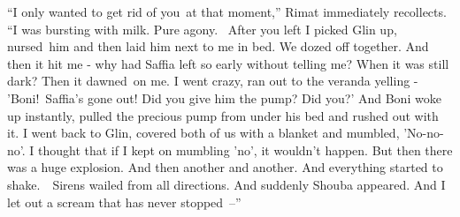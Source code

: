 \documentclass[twoside,11pt]{book}
\begin{document}
``I only wanted to get rid of you\ at that moment,'' Rimat immediately recollects.
``I was bursting with milk. Pure agony. ~After you left I picked Glin up, nursed{\ }him and
then laid him next to me in bed. We dozed off together. And then it hit me - why had Saffia left so early without
telling me? When it was still dark? Then it dawned{\ }on me. I went crazy, ran out to the veranda
yelling - 'Boni!\ Saffia's gone out! Did you give him the pump? Did you?' And Boni woke up instantly, pulled the
precious pump from under his bed and rushed out with it. I went back to Glin, covered both of us with a blanket and
mumbled, 'No-no-no'. I thought that if I kept on mumbling 'no', it wouldn't happen. But then there was a huge
explosion. And then another and another. And everything started to shake.\ \ Sirens wailed from all directions. And
suddenly Shouba appeared. And I let out a scream that has never stopped\ {}--''
\end{document}
